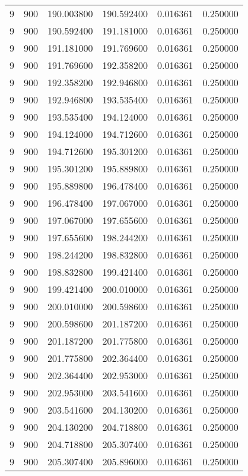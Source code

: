 \begin{longtable}{rrrrrr}
9 & 900 & 190.003800 & 190.592400 & 0.016361 & 0.250000 \\
9 & 900 & 190.592400 & 191.181000 & 0.016361 & 0.250000 \\
9 & 900 & 191.181000 & 191.769600 & 0.016361 & 0.250000 \\
9 & 900 & 191.769600 & 192.358200 & 0.016361 & 0.250000 \\
9 & 900 & 192.358200 & 192.946800 & 0.016361 & 0.250000 \\
9 & 900 & 192.946800 & 193.535400 & 0.016361 & 0.250000 \\
9 & 900 & 193.535400 & 194.124000 & 0.016361 & 0.250000 \\
9 & 900 & 194.124000 & 194.712600 & 0.016361 & 0.250000 \\
9 & 900 & 194.712600 & 195.301200 & 0.016361 & 0.250000 \\
9 & 900 & 195.301200 & 195.889800 & 0.016361 & 0.250000 \\
9 & 900 & 195.889800 & 196.478400 & 0.016361 & 0.250000 \\
9 & 900 & 196.478400 & 197.067000 & 0.016361 & 0.250000 \\
9 & 900 & 197.067000 & 197.655600 & 0.016361 & 0.250000 \\
9 & 900 & 197.655600 & 198.244200 & 0.016361 & 0.250000 \\
9 & 900 & 198.244200 & 198.832800 & 0.016361 & 0.250000 \\
9 & 900 & 198.832800 & 199.421400 & 0.016361 & 0.250000 \\
9 & 900 & 199.421400 & 200.010000 & 0.016361 & 0.250000 \\
9 & 900 & 200.010000 & 200.598600 & 0.016361 & 0.250000 \\
9 & 900 & 200.598600 & 201.187200 & 0.016361 & 0.250000 \\
9 & 900 & 201.187200 & 201.775800 & 0.016361 & 0.250000 \\
9 & 900 & 201.775800 & 202.364400 & 0.016361 & 0.250000 \\
9 & 900 & 202.364400 & 202.953000 & 0.016361 & 0.250000 \\
9 & 900 & 202.953000 & 203.541600 & 0.016361 & 0.250000 \\
9 & 900 & 203.541600 & 204.130200 & 0.016361 & 0.250000 \\
9 & 900 & 204.130200 & 204.718800 & 0.016361 & 0.250000 \\
9 & 900 & 204.718800 & 205.307400 & 0.016361 & 0.250000 \\
9 & 900 & 205.307400 & 205.896000 & 0.016361 & 0.250000 \\

\end{longtable}
